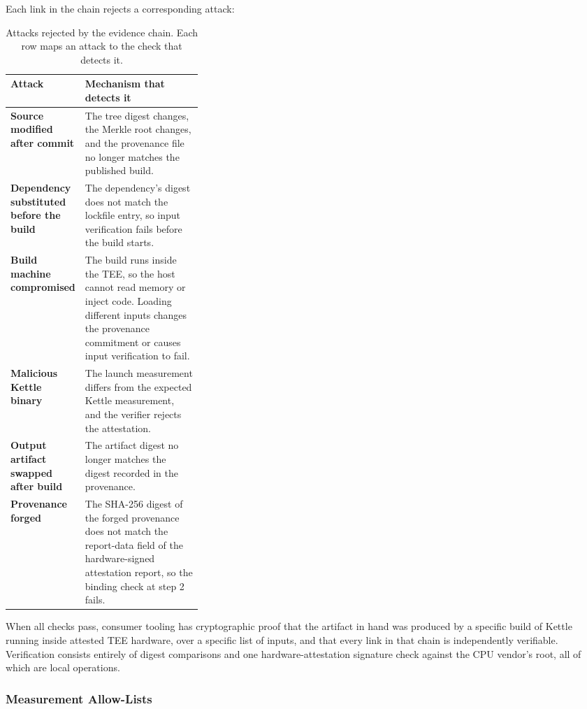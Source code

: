 \documentclass[11pt]{article}
\begin{document}
Each link in the chain rejects a corresponding attack:

\begin{table}[H]
\centering
\small
\begin{tabularx}{\linewidth}{@{} >{\bfseries}p{0.32\linewidth} X @{}}
\toprule
Attack & Mechanism that detects it \\
\midrule
Source modified after commit & The tree digest changes, the Merkle root changes, and the provenance file no longer matches the published build. \\
\addlinespace
Dependency substituted before the build & The dependency's digest does not match the lockfile entry, so input verification fails before the build starts. \\
\addlinespace
Build machine compromised & The build runs inside the TEE, so the host cannot read memory or inject code. Loading different inputs changes the provenance commitment or causes input verification to fail. \\
\addlinespace
Malicious Kettle binary & The launch measurement differs from the expected Kettle measurement, and the verifier rejects the attestation. \\
\addlinespace
Output artifact swapped after build & The artifact digest no longer matches the digest recorded in the provenance. \\
\addlinespace
Provenance forged & The SHA-256 digest of the forged provenance does not match the report-data field of the hardware-signed attestation report, so the binding check at step 2 fails. \\
\bottomrule
\end{tabularx}
\caption{Attacks rejected by the evidence chain. Each row maps an attack to the check that detects it.}
\end{table}

When all checks pass, consumer tooling has cryptographic proof that the artifact in hand was produced by a specific build of Kettle running inside attested TEE hardware, over a specific list of inputs, and that every link in that chain is independently verifiable. Verification consists entirely of digest comparisons and one hardware-attestation signature check against the CPU vendor's root, all of which are local operations.

\subsubsection{Measurement Allow-Lists}
\label{sec:allow-lists}
\end{document}
